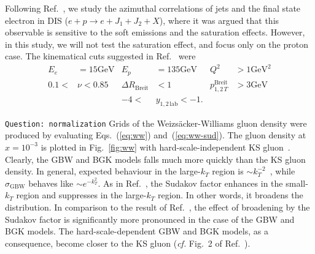 \documentclass[11pt]{article}
\numberwithin{equation}{section}
\numberwithin{table}{section}
\numberwithin{figure}{section}
\newcommand{\GeV}[0]{\mathrm{GeV}}
\newcommand{\comment}[1]{\texttt{\color{red}#1}}
\begin{document}

Following Ref.~\cite{vanHameren:2021sqc}, we study the azimuthal correlations of jets and the final state electron in DIS ($e+p\rightarrow e+J_1+J_2+X$), where it was argued that this observable is sensitive to the soft emissions and the saturation effects. However, in this study, we will not test the saturation effect, and focus only on the proton case.
The kinematical cuts suggested in Ref.~\cite{vanHameren:2021sqc} were
\begin{align*}
	E_e&=15\GeV& E_p&=135\GeV& Q^2&>1\GeV^2\\
	0.1<&\nu<0.85&\Delta R_{\mathrm{Breit}}&<1&p^{\mathrm{Breit}}_{1,2\,T}&>3\GeV\\
	&&-4<&y_{1,2\,\mathrm{lab}}<-1.&&
\end{align*}

\comment{Question: normalization}
Grids of the Weizs\"acker-Williams gluon density were produced by evaluating Eqs.~(\ref{eq:ww}) and~(\ref{eq:ww-sud}).
The gluon density at $x=10^{-3}$ is plotted in Fig.~\ref{fig:ww} with hard-scale-independent KS gluon~\cite{vanHameren:2021sqc,Abdulov:2021ivr}. Clearly, the GBW and BGK models falls much more quickly than the KS gluon density. In general, expected behaviour in the large-$k_T$ region is $\sim k_T^{-2}$~\cite{Dominguez:2010xd,Dominguez:2011wm}, while $\sigma_{\mathrm{GBW}}$ behaves like $\sim e^{-k_T^2}$.
As in Ref.~\cite{vanHameren:2021sqc}, the Sudakov factor enhances in the small-$k_T$ region and suppresses in the large-$k_T$ region. In other words, it broadens the distribution. In comparison to the result of Ref.~\cite{vanHameren:2021sqc}, the effect of broadening by the Sudakov factor is significantly more pronounced in the case of the GBW and BGK models. The hard-scale-dependent GBW and BGK models, as a consequence, become closer to the KS gluon (\textit{cf.} Fig.~2 of Ref.~\cite{vanHameren:2021sqc}).  
\end{document}

